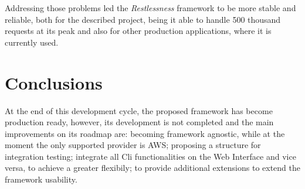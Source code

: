 \documentclass{article}
\begin{document}
\noindent
Addressing those problems led the \textit{Restlessness} framework to be more stable
and reliable, both for the described project, being it able to handle 500 thousand
requests at its peak and also for other production applications, where it is currently
used.

\section{Conclusions}
At the end of this development cycle, the proposed framework has become production
ready, however, its development is not completed and the main improvements on its
roadmap are: becoming framework agnostic, while at the moment the only supported
provider is AWS; proposing a structure for integration testing; integrate all Cli
functionalities on the Web Interface and vice versa, to achieve a greater flexibily;
to provide additional extensions to extend the framework usability.
\end{document}
